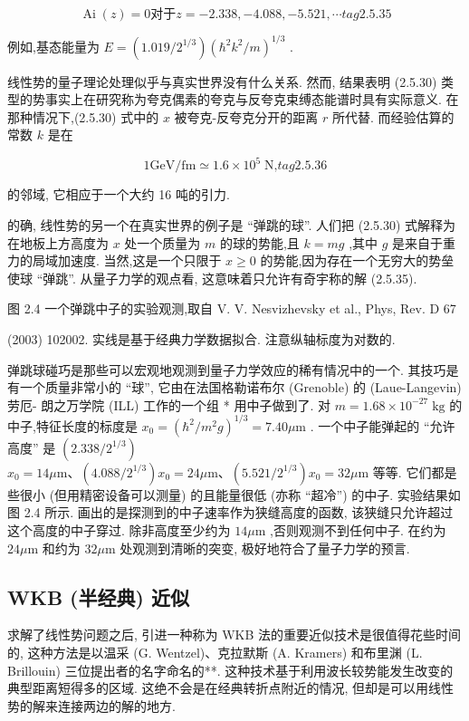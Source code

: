 \documentclass[lang=cn,newtx,10pt,scheme=chinese,thmcnt=section]{elegantbook}
\begin{document}
$$
\operatorname{Ai}\left( z\right) = 0\text{对于}z = - {2.338}, - {4.088}, - {5.521},\cdots tag{2.5.35}
$$

例如,基态能量为 $E = \left( {{1.019}/{2}^{1/3}}\right) {\left( {\hbar }^{2}{k}^{2}/m\right) }^{1/3}$ .

线性势的量子理论处理似乎与真实世界没有什么关系. 然而, 结果表明 (2.5.30) 类型的势事实上在研究称为夸克偶素的夸克与反夸克束缚态能谱时具有实际意义. 在那种情况下,(2.5.30) 式中的 $x$ 被夸克-反夸克分开的距离 $r$ 所代替. 而经验估算的常数 $k$ 是在

$$
1\mathrm{{GeV}}/\mathrm{{fm}} \simeq {1.6} \times {10}^{5}\mathrm{\;N}\text{,} tag{2.5.36}
$$

的邻域, 它相应于一个大约 16 吨的引力.

的确, 线性势的另一个在真实世界的例子是 “弹跳的球”. 人们把 (2.5.30) 式解释为在地板上方高度为 $x$ 处一个质量为 $m$ 的球的势能,且 $k = {mg}$ ,其中 $g$ 是来自于重力的局域加速度. 当然,这是一个只限于 $x \geq 0$ 的势能,因为存在一个无穷大的势垒使球 “弹跳”. 从量子力学的观点看, 这意味着只允许有奇宇称的解 (2.5.35).



图 2.4 一个弹跳中子的实验观测,取自 V. V. Nesvizhevsky et al., Phys, Rev. D 67

(2003) 102002. 实线是基于经典力学数据拟合. 注意纵轴标度为对数的.

弹跳球碰巧是那些可以宏观地观测到量子力学效应的稀有情况中的一个. 其技巧是有一个质量非常小的 “球”, 它由在法国格勒诺布尔 (Grenoble) 的 (Laue-Langevin) 劳厄- 朗之万学院 (ILL) 工作的一个组 * 用中子做到了. 对 $m = {1.68} \times {10}^{-{27}}\mathrm{\;{kg}}$ 的中子,特征长度的标度是 ${x}_{0} = {\left( {\hbar }^{2}/{m}^{2}g\right) }^{1/3} = {7.40\mu }\mathrm{m}$ . 一个中子能弹起的 “允许高度” 是 $\left( {{2.338}/{2}^{1/3}}\right)$ ${x}_{0} = {14\mu }\mathrm{m}\text{、}\left( {{4.088}/{2}^{1/3}}\right) {x}_{0} = {24\mu }\mathrm{m}\text{、}\left( {{5.521}/{2}^{1/3}}\right) {x}_{0} = {32\mu }\mathrm{m}$ 等等. 它们都是些很小 (但用精密设备可以测量) 的且能量很低 (亦称 “超冷”) 的中子. 实验结果如图 2.4 所示. 画出的是探测到的中子速率作为狭缝高度的函数, 该狭缝只允许超过这个高度的中子穿过. 除非高度至少约为 ${14\mu }\mathrm{m}$ ,否则观测不到任何中子. 在约为 ${24\mu }\mathrm{m}$ 和约为 ${32\mu }\mathrm{m}$ 处观测到清晰的突变, 极好地符合了量子力学的预言.


\subsection*{WKB (半经典) 近似}
求解了线性势问题之后, 引进一种称为 WKB 法的重要近似技术是很值得花些时间的, 这种方法是以温采 (G. Wentzel)、克拉默斯 (A. Kramers) 和布里渊 (L. Brillouin) 三位提出者的名字命名的**. 这种技术基于利用波长较势能发生改变的典型距离短得多的区域. 这绝不会是在经典转折点附近的情况, 但却是可以用线性势的解来连接两边的解的地方.
\end{document}
